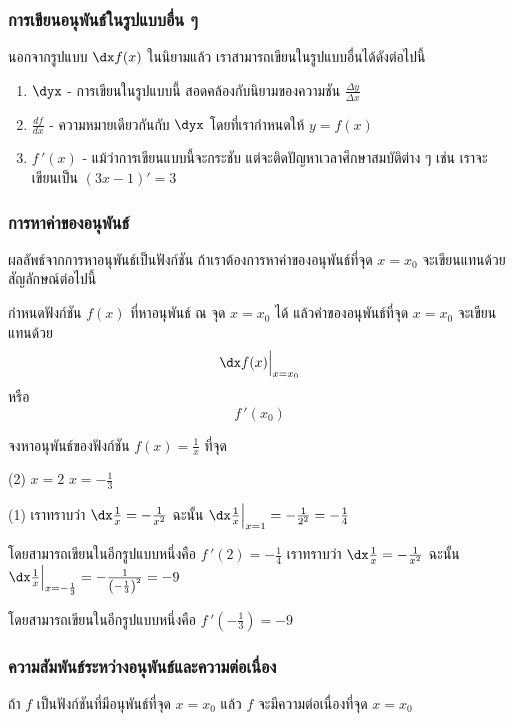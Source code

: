 \begin{frame}
\frametitle{การเขียนอนุพันธ์ในรูปแบบอื่น ๆ}
นอกจากรูปแบบ $\dx f(x)$ ในนิยามแล้ว เราสามารถเขียนในรูปแบบอื่นได้ดังต่อไปนี้
\begin{enumerate}
\item $\dyx$ - การเขียนในรูปแบบนี้ สอดคล้องกับนิยามของความชัน $\frac{\Delta y}{\Delta x}$
\item $\frac{df}{dx}$ - ความหมายเดียวกันกับ $\dyx$ โดยที่เรากำหนดให้ $y = f(x)$ 
\item $f\,'(x)$ - แม้ว่าการเขียนแบบนี้จะกระชับ แต่จะติดปัญหาเวลาศึกษาสมบัติต่าง ๆ เช่น เราจะ\textbf{}เขียนเป็น $(3x-1)' = 3$ 
\end{enumerate}
\end{frame}

\begin{frame}
\frametitle{การหาค่าของอนุพันธ์}
ผลลัพธ์จากการหาอนุพันธ์เป็นฟังก์ชัน ถ้าเราต้องการหาค่าของอนุพันธ์ที่จุด $x=x_0$ จะเขียนแทนด้วยสัญลักษณ์ต่อไปนี้
\begin{remark}{}
กำหนดฟังก์ชัน $f(x)$ ที่หาอนุพันธ์ ณ จุด $x = x_0$ ได้ แล้วค่าของอนุพันธ์ที่จุด $x=x_0$ จะเขียนแทนด้วย
\[ \dx f(x) \Big|_{x=x_0} \]
หรือ
\[ f\,'(x_0) \]
\end{remark}
\end{frame}


\begin{frame}[t]
\begin{ex}
จงหาอนุพันธ์ของฟังก์ชัน $f(x) = \frac{1}{x}$ ที่จุด 
\begin{tasks}(2)
\task $x = 2$
\task $x = -\frac{1}{3}$
\end{tasks}
\end{ex}
\begin{sol}
\begin{tasks}(1)
\task เราทราบว่า $\dx \frac{1}{x} = -\frac{1}{x^2}$ ฉะนั้น  $\dx \frac{1}{x} \Big|_{x = 1} = -\frac{1}{2^2} = -\frac{1}{4}$

โดยสามารถเขียนในอีกรูปแบบหนึ่งคือ $f\,'(2) = -\frac{1}{4}$
\task เราทราบว่า $\dx \frac{1}{x} = -\frac{1}{x^2}$ ฉะนั้น $\dx \frac{1}{x} \Big|_{x = -\frac{1}{3}} = -\frac{1}{\left(-\frac{1}{3}\right)^2} = -9$

โดยสามารถเขียนในอีกรูปแบบหนึ่งคือ $f\,'\left(-\frac{1}{3}\right) = -9$
\end{tasks}
\end{sol}
\end{frame}

\begin{frame}
\frametitle{ความสัมพันธ์ระหว่างอนุพันธ์และความต่อเนื่อง}

\begin{cor}{}{}
ถ้า $f$ เป็นฟังก์ชันที่มีอนุพันธ์ที่จุด $x = x_0$ แล้ว $f$ จะมีความต่อเนื่องที่จุด $x = x_0$
\end{cor}
\end{frame}

